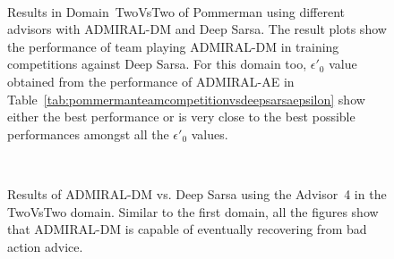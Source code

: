 \documentclass[jair, twoside,11pt,theapa]{article}
\begin{document}
\begin{figure}[h]
\centering
	\\
  \caption{Results in Domain~TwoVsTwo of Pommerman using different advisors with ADMIRAL-DM and Deep Sarsa. The result plots show the performance of team playing ADMIRAL-DM in training competitions against Deep Sarsa. For this domain too, $\epsilon'_0$ value obtained from the performance of ADMIRAL-AE in Table~\ref{tab:pommermanteamcompetitionvsdeepsarsaepsilon} show either the best performance or is very close to the best possible performances amongst all the $\epsilon'_0$ values. 
  }

	\label{fig:teamcompetitionresults}
\end{figure}












\begin{figure}[h]
\centering

	\\
	
  \caption{Results of ADMIRAL-DM vs. Deep Sarsa using the Advisor~4 in the TwoVsTwo domain. Similar to the first domain, all the figures show that ADMIRAL-DM is capable of eventually recovering from bad action advice.
  }%
	\label{fig:advisor4performancetwovstwo}
\end{figure}
\end{document}
